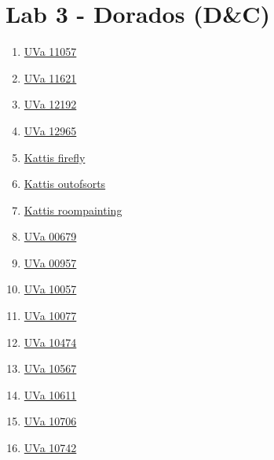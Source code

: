 \section{Lab 3 - Dorados (D\&C)}
        \begin{enumerate}
\item \href{https://onlinejudge.org/index.php?option=com_onlinejudge&Itemid=8&page=show_problem&problem=1998}{UVa 11057}
\item \href{https://onlinejudge.org/index.php?option=com_onlinejudge&Itemid=8&page=show_problem&problem=2668}{UVa 11621}
\item \href{https://onlinejudge.org/index.php?option=com_onlinejudge&Itemid=8&page=show_problem&problem=3344}{UVa 12192}
\item \href{https://onlinejudge.org/index.php?option=com_onlinejudge&Itemid=8&page=show_problem&problem=4844}{UVa 12965}
\item \href{https://open.kattis.com/problems/firefly}{Kattis firefly}
\item \href{https://open.kattis.com/problems/outofsorts}{Kattis outofsorts}
\item \href{https://open.kattis.com/problems/roompainting}{Kattis roompainting}
\item \href{https://onlinejudge.org/index.php?option=com_onlinejudge&Itemid=8&page=show_problem&problem=620}{UVa 00679}
\item \href{https://onlinejudge.org/index.php?option=com_onlinejudge&Itemid=8&page=show_problem&problem=898}{UVa 00957}
\item \href{https://onlinejudge.org/index.php?option=com_onlinejudge&Itemid=8&page=show_problem&problem=998}{UVa 10057}
\item \href{https://onlinejudge.org/index.php?option=com_onlinejudge&Itemid=8&page=show_problem&problem=1018}{UVa 10077}
\item \href{https://onlinejudge.org/index.php?option=com_onlinejudge&Itemid=8&page=show_problem&problem=1415}{UVa 10474}
\item \href{https://onlinejudge.org/index.php?option=com_onlinejudge&Itemid=8&page=show_problem&problem=1508}{UVa 10567}
\item \href{https://onlinejudge.org/index.php?option=com_onlinejudge&Itemid=8&page=show_problem&problem=1552}{UVa 10611}
\item \href{https://onlinejudge.org/index.php?option=com_onlinejudge&Itemid=8&page=show_problem&problem=1647}{UVa 10706}
\item \href{https://onlinejudge.org/index.php?option=com_onlinejudge&Itemid=8&page=show_problem&problem=1683}{UVa 10742}

\end{enumerate}
